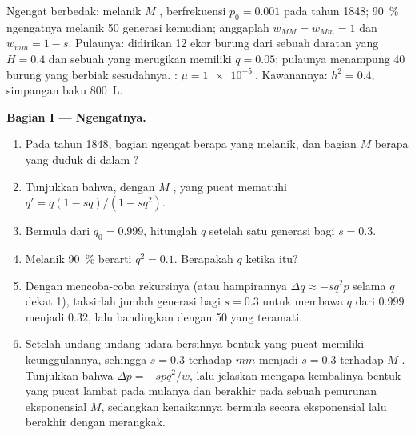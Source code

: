 \begin{problem}
\label{pb:b2:population-genetics:1}
Ngengat berbedak:  melanik $M$ , berfrekuensi $p_0 = 0.001$
pada tahun 1848; \qty{90}{\%} ngengatnya melanik 50 generasi kemudian;
anggaplah $w_{MM} = w_{Mm} = 1$ dan $w_{mm} = 1 - s$. Pulaunya:
didirikan 12 ekor burung dari sebuah daratan yang $H = 0.4$ dan sebuah
  yang merugikan memiliki $q = 0.05$; pulaunya menampung 40
burung yang berbiak sesudahnya. : $\mu = \qty{1e-5}{}$.
Kawanannya: $h^{2} = 0.4$, simpangan baku \qty{800}{L}.

\medskip
\noindent\textbf{Bagian I --- Ngengatnya.}
\begin{enumerate}
  \item Pada tahun 1848, bagian ngengat berapa yang melanik, dan
        bagian  $M$ berapa yang duduk di dalam ?
  \item Tunjukkan bahwa, dengan $M$ ,  yang pucat
        mematuhi $q' = q(1 - sq)/(1 - sq^{2})$.
  \item Bermula dari $q_0 = 0.999$, hitunglah $q$ setelah satu generasi
        bagi $s = 0.3$.
  \item Melanik \qty{90}{\%} berarti $q^{2} = 0.1$. Berapakah $q$
        ketika itu?
  \item Dengan mencoba-coba rekursinya (atau hampirannya
        $\Delta q \approx -sq^{2}p$ selama $q$ dekat 1), taksirlah
        jumlah generasi bagi $s = 0.3$ untuk membawa $q$ dari $0.999$
        menjadi $0.32$, lalu bandingkan dengan 50 yang teramati.
  \item Setelah undang-undang udara bersihnya bentuk yang pucat
        memiliki keunggulannya, sehingga $s
        = 0.3$ terhadap $mm$
        menjadi $s = 0.3$ terhadap $M\_$. Tunjukkan bahwa $\Delta p = -spq^{2}/\bar w$, lalu jelaskan mengapa kembalinya bentuk yang
        pucat lambat pada mulanya dan berakhir pada sebuah penurunan
        eksponensial $M$, sedangkan kenaikannya bermula secara
        eksponensial lalu berakhir dengan merangkak.
\end{enumerate}


\end{problem}
